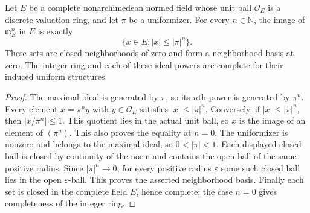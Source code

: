 \begin{lemma}
\label{fw:ideal-powers-topology}
\leanok
Let $E$ be a complete nonarchimedean normed field whose unit ball
$\mathcal O_E$ is a discrete valuation ring, and let $\pi$ be a
uniformizer. For every $n\in\mathbb N$, the image of
$\mathfrak m_E^n$ in $E$ is exactly
\[
 \{x\in E:|x|\leq|\pi|^n\}.
\]
These sets are closed neighborhoods of zero and form a neighborhood
basis at zero. The integer ring and each of these ideal powers
are complete for their induced uniform structures.
\end{lemma}
\begin{proof}
The maximal ideal is generated by $\pi$, so its $n$th power is
generated by $\pi^n$. Every element $x=\pi^n y$ with
$y\in\mathcal O_E$ satisfies $|x|\leq|\pi|^n$.
Conversely, if $|x|\leq|\pi|^n$, then
$|x/\pi^n|\leq1$. This quotient lies in the actual unit ball,
so $x$ is the image of an element of $(\pi^n)$.
This also proves the equality at $n=0$.
The uniformizer is nonzero and belongs to the maximal ideal,
so $0<|\pi|<1$. Each displayed closed ball is closed by continuity
of the norm and contains the open ball of the same positive radius.
Since $|\pi|^n\longrightarrow0$, for every positive radius
$\varepsilon$ some such closed ball lies in the open
$\varepsilon$-ball. This proves the asserted neighborhood basis.
Finally each set is closed in the complete field $E$, hence complete;
the case $n=0$ gives completeness of the integer ring.
\end{proof}


